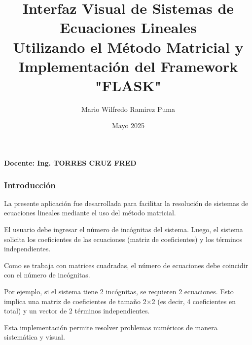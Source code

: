 \documentclass{beamer}
\title[Interfaz Visual de Sistemas de Ecuaciones Lineales]{Interfaz Visual de Sistemas de Ecuaciones Lineales \\ Utilizando el Método Matricial y Implementación del Framework "FLASK"}
\author[Mario Wilfredo Ramirez Puma]{Mario Wilfredo Ramirez Puma}
\institute[Universidad Nacional del Altiplano Puno]{ Universidad Nacional del Altiplano Puno \\ Escuela Profesional de Ingeniería Estadística e Informática}
\date[Mayo 2025]{Mayo 2025}
\begin{document}
\begin{frame}[plain]
    \titlepage
    \vfill
    \begin{center}
        \large \textbf{Docente: Ing. TORRES CRUZ FRED}
    \end{center}
\end{frame}

\begin{frame}
    \frametitle{Introducción}
    La presente aplicación fue desarrollada para facilitar la resolución de sistemas de ecuaciones lineales mediante el uso del método matricial. 

    \vspace{0.5cm}

    El usuario debe ingresar el número de incógnitas del sistema. Luego, el sistema solicita los coeficientes de las ecuaciones (matriz de coeficientes) y los términos independientes. 

    \vspace{0.5cm}

    Como se trabaja con matrices cuadradas, el número de ecuaciones debe coincidir con el número de incógnitas. 

    Por ejemplo, si el sistema tiene 2 incógnitas, se requieren 2 ecuaciones. Esto implica una matriz de coeficientes de tamaño 2×2 (es decir, 4 coeficientes en total) y un vector de 2 términos independientes.

    \vspace{0.5cm}

    Esta implementación permite resolver problemas numéricos de manera sistemática y visual.
\end{frame}
\end{document}
